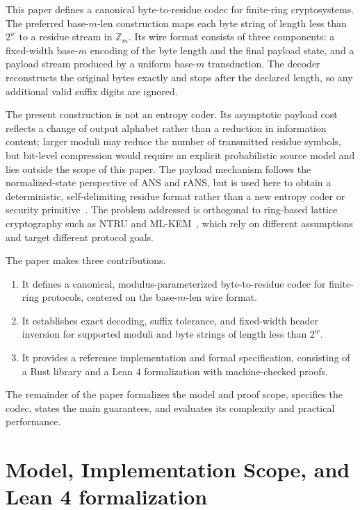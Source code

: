 \documentclass{system-security-article}
\newcommand{\Zm}{\ensuremath{\mathbb{Z}_m}}
\newcommand{\BaseM}{base-\(m\)}
\newcommand{\BaseMLen}{\BaseM{}-len}
\begin{document}
    This paper defines a canonical byte-to-residue codec for finite-ring cryptosystems.
    The preferred \BaseMLen{} construction maps each byte string of length less than \(2^{w}\) to a residue stream in \(\Zm\).
    Its wire format consists of three components: a fixed-width base-\(m\) encoding of the byte length and the final
    payload state, and a payload stream produced by a uniform base-\(m\) transduction.
    The decoder reconstructs the original bytes exactly and stops after the declared length,
    so any additional valid suffix digits are ignored.

    The present construction is not an entropy coder.
    Its asymptotic payload cost reflects a change of output alphabet rather than a reduction in information content;
    larger moduli may reduce the number of transmitted residue symbols, but bit-level compression would require an
    explicit probabilistic source model and lies outside the scope of this paper.
    The payload mechanism follows the normalized-state perspective of ANS and rANS, but is used here to
    obtain a deterministic, self-delimiting residue format rather than a new entropy coder or security primitive~\cite{duda2013ans,giesen2014rans}.
    The problem addressed is orthogonal to ring-based lattice cryptography such as
    NTRU and ML-KEM~\cite{ntru1998,nist2024post}, which rely on different assumptions and target different protocol goals.

    The paper makes three contributions.
    \begin{enumerate}
        \item It defines a canonical, modulus-parameterized byte-to-residue codec for finite-ring protocols,
        centered on the \BaseMLen{} wire format.
        \item It establishes exact decoding, suffix tolerance, and fixed-width header inversion for supported
        moduli and byte strings of length less than \(2^{w}\).
        \item It provides a reference implementation and formal specification, consisting of a
        Rust library and a Lean 4 formalization with machine-checked proofs.
    \end{enumerate}

    The remainder of the paper formalizes the model and proof scope, specifies the codec, states the
    main guarantees, and evaluates its complexity and practical performance.

    \section{Model, Implementation Scope, and Lean 4 formalization}
    \label{sec:model}
\end{document}
